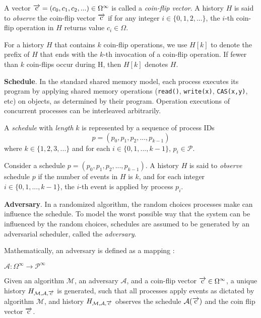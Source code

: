 A vector $\overrightarrow{\rm c} = (c_0, c_1, c_2,...) \in \Omega^{\infty}$ is called a \emph{coin-flip vector}.
A history $H$ is said to \emph{observe} the coin-flip vector $\overrightarrow{\rm c}$ if
for any integer $i \in \{0, 1, 2, ...\}$, the $i$-th coin-flip operation in $H$ returns value $c_i \in \Omega$.

For a history $H$ that contains $k$ coin-flip operations, we use $H[k]$ to denote the prefix of $H$
that ends with the $k$-th invocation of a coin-flip operation. If fewer than $k$ coin-flips occur during H, then $H[k]$ denotes $H$.

\textbf{Schedule}.
In the standard shared memory model, each process executes its program by applying
shared memory operations (\texttt{read()}, \texttt{write(x)}, \texttt{CAS(x,y)}, etc) on objects,
as determined by their program. Operation executions of concurrent processes
can be interleaved arbitrarily.

A \emph{schedule} with \emph{length} $k$ is represented by a sequence of process IDs
$$p = (p_0, p_1, p_2,..., p_{k-1})$$ where $k \in \{1, 2, 3, ...\}$ and for each $i \in \{0, 1, ..., k-1\}$,
$p_i \in \mathcal{P}$.

Consider a schedule $p = (p_0, p_1, p_2,..., p_{k-1})$.
A history $H$ is said to \emph{observe} schedule $p$ if the number of events in $H$ is $k$,
and for each integer $i \in \{0, 1, ..., k-1\}$, the $i$-th event is applied by process $p_i$.

\textbf{Adversary}.
In a randomized algorithm, the random choices processes make can influence the schedule.
To model the worst possible way that the system can be influenced by the random choices,
schedules are assumed to be generated by an adversarial scheduler, called the \emph{adversary}.

Mathematically, an adversary is defined as a mapping \cite{golab2011linearizable}:
\begin{center}
$\mathcal{A} :  \Omega^{\infty} \to \mathcal{P}^{\infty}$
\end{center}

Given an algorithm $\mathcal{M}$, an adversary $\mathcal{A}$, and
a coin-flip vector $\overrightarrow{\rm c} \in \Omega^{\infty}$,
a unique history $H_{\mathcal{M},\mathcal{A}, \overrightarrow{\rm c}}$ is generated, such that all
processes apply events as dictated by algorithm $\mathcal{M}$, and history
$H_{\mathcal{M}, \mathcal{A}, \overrightarrow{\rm c}}$
observes the schedule $\mathcal{A(\overrightarrow{\rm c})}$ and the coin flip vector $\overrightarrow{\rm c}$.

